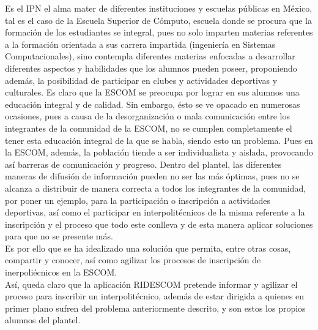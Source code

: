 	Es el IPN el alma mater de diferentes instituciones y escuelas públicas en México, tal es el caso de la Escuela Superior de Cómputo, escuela donde se procura que la formación de los estudiantes se integral, pues no solo imparten materias referentes a la formación orientada a sus carrera impartida (ingeniería en Sistemas Computacionales), sino contempla diferentes materias enfocadas a desarrollar diferentes aspectos y habilidades que los alumnos pueden poseer, proponiendo además, la posibilidad de participar en clubes y actividades deportivas y culturales. Es claro que la ESCOM se preocupa por lograr en sus alumnos una educación integral y de calidad. Sin embargo, ésto se ve opacado en numerosas ocasiones, pues a causa de la desorganización o mala comunicación entre los integrantes de la comunidad de la ESCOM, no se cumplen completamente el tener esta educación integral de la que se habla, siendo esto un problema. Pues en la ESCOM, además, la población tiende a ser individualista y aislada, provocando así barreras de comunicación y progreso. Dentro del plantel, las diferentes maneras de difusión de información pueden no ser las más óptimas, pues no se alcanza a distribuir de manera correcta a todos los integrantes de la comunidad, por poner un ejemplo, para la participación o inscripción a actividades deportivas, así como el participar en interpolitécnicos de la misma referente a la inscripción y el proceso que todo este conlleva y de esta manera aplicar soluciones para que no se presente más.\\
	Es por ello que se ha idealizado una solución que permita, entre otras cosas, compartir y conocer, así como agilizar los procesos de inscripción de inerpoliécnicos en la ESCOM.\\
	Así, queda claro que la aplicación RIDESCOM pretende informar y agilizar el proceso para inscribir un interpolitécnico, además de estar dirigida a quienes en primer plano sufren del problema anteriormente descrito, y son estos los propios alumnos del plantel.
	
	
